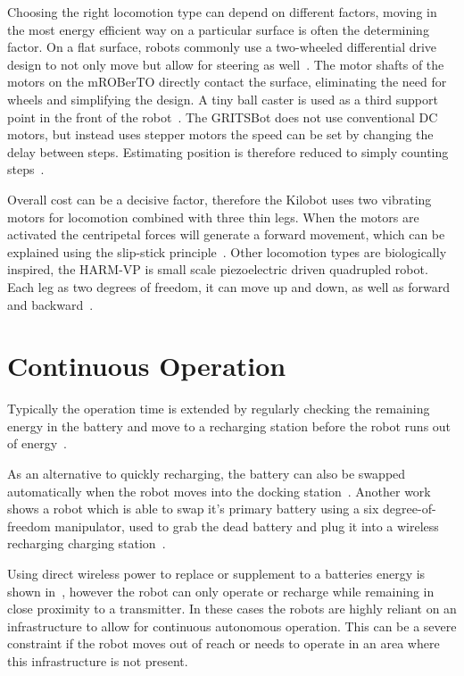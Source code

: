 Choosing the right locomotion type can depend on different factors, moving in the most energy efficient way on a particular surface is often the determining factor.
On a flat surface, robots commonly use a two-wheeled differential drive design to not only move but allow for steering as well~\cite{sabelhaus_icra_2013, pickem_icra_2015}.
The motor shafts of the motors on the mROBerTO directly contact the surface, eliminating the need for wheels and simplifying the design.
A tiny ball caster is used as a third support point in the front of the robot~\cite{kim_iros_2016}.
The GRITSBot does not use conventional DC motors, but instead uses stepper motors the speed can be set by changing the delay between steps. 
Estimating position is therefore reduced to simply counting steps~\cite{pickem_icra_2015}.

Overall cost can be a decisive factor, therefore the Kilobot uses two vibrating motors for locomotion combined with three thin legs.
When the motors are activated the centripetal forces will generate a forward movement, which can be explained using the slip-stick principle~\cite{rubenstein_icra_2012}.
Other locomotion types are biologically inspired, the HARM-VP is small scale piezoelectric driven quadrupled robot.
Each leg as two degrees of freedom, it can move up and down, as well as forward and backward~\cite{baisch_iros_2013}.

\section{Continuous Operation}
\label{sec:rw_continous_operation}

Typically the operation time is extended by regularly checking the remaining energy in the battery and move to a recharging station before the robot runs out of energy~\cite{pickem_icra_2015, rubenstein_icra_2012}.

As an alternative to quickly recharging, the battery can also be swapped automatically when the robot moves into the docking station~\cite{kemal_mech_2015}.
Another work shows a robot which is able to swap it's primary battery using a six degree-of-freedom manipulator, used to grab the dead battery and plug it into a wireless recharging charging station~\cite{zhang_conel_2013}.

Using direct wireless power to replace or supplement to a batteries energy is shown in~\cite{karpelson_icra_2014}, however the robot can only operate or recharge while remaining in close proximity to a transmitter. 
In these cases the robots are highly reliant on an infrastructure to allow for continuous autonomous operation.
This can be a severe constraint if the robot moves out of reach or needs to operate in an area where this infrastructure is not present.
 
